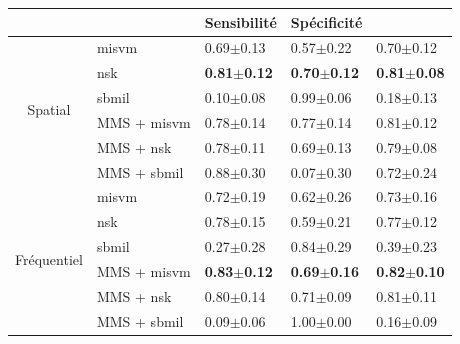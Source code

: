 \vspace{25pt}

\begin{table}[H]
    \centering
    \begin{tabular}{cllll}
        \toprule
        \multicolumn{1}{l}{}         &                      & Sensibilité           & Spécificité           & \fscore{}             \\ \midrule
        \multirow{6}{*}{Spatial}     & \gls{misvm}          & 0.69$\pm$0.13             & 0.57$\pm$0.22             & 0.70$\pm$0.12             \\
                                     & \gls{nsk}            & \textbf{0.81$\pm$0.12}    & \textbf{0.70$\pm$0.12}    & \textbf{0.81$\pm$0.08}    \\
                                     & \gls{sbmil}          & 0.10$\pm$0.08             & 0.99$\pm$0.06             & 0.18$\pm$0.13             \\
                                     & MMS + \gls{misvm}    & 0.78$\pm$0.14             & 0.77$\pm$0.14             & 0.81$\pm$0.12             \\
                                     & MMS + \gls{nsk}      & 0.78$\pm$0.11             & 0.69$\pm$0.13             & 0.79$\pm$0.08             \\
                                     & MMS + \gls{sbmil}    & 0.88$\pm$0.30             & 0.07$\pm$0.30             & 0.72$\pm$0.24             \\ \midrule
        \multirow{6}{*}{Fréquentiel} & \gls{misvm}          & 0.72$\pm$0.19             & 0.62$\pm$0.26             & 0.73$\pm$0.16             \\
                                     & \gls{nsk}            & 0.78$\pm$0.15             & 0.59$\pm$0.21             & 0.77$\pm$0.12             \\
                                     & \gls{sbmil}          & 0.27$\pm$0.28             & 0.84$\pm$0.29             & 0.39$\pm$0.23             \\
                                     & MMS + \gls{misvm}    & \textbf{0.83$\pm$0.12}    & \textbf{0.69$\pm$0.16}    & \textbf{0.82$\pm$0.10}    \\
                                     & MMS + \gls{nsk}      & 0.80$\pm$0.14             & 0.71$\pm$0.09             & 0.81$\pm$0.11             \\
                                     & MMS + \gls{sbmil}    & 0.09$\pm$0.06             & 1.00$\pm$0.00             & 0.16$\pm$0.09             \\ \midrule

\end{tabular}
\end{table}
